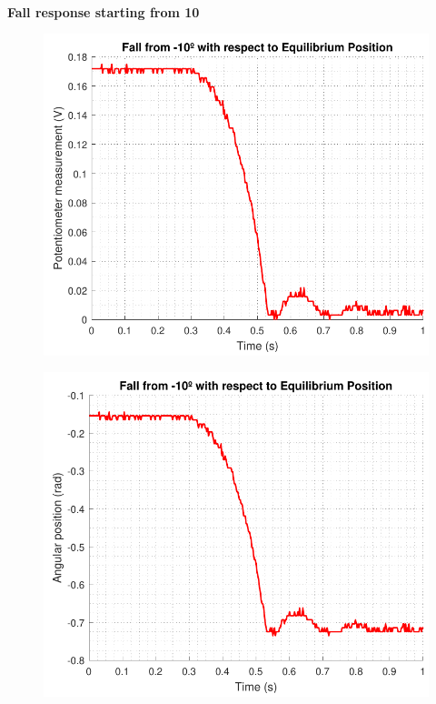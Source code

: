 \small\textbf{Fall response starting from \si{10^\circ}}

\begin{minipage}{\linewidth}
	\begin{minipage}{0.45\linewidth}
		\begin{figure}[H]
			\includegraphics[scale=.53]{figures/tenDegFallVolt}
			\captionsetup{justification=centering}
			\label{tenDegFallVolt}
		\end{figure}%
	\end{minipage}
	\hspace{0.03\linewidth}
	\begin{minipage}{0.45\linewidth}
		\begin{figure}[H]\vspace{-4mm}
			\includegraphics[scale=.53]{figures/tenDegFallRad}
			\captionsetup{justification=centering}
			\label{tenDegFallRad}
		\end{figure}%
	\end{minipage}
\end{minipage}


